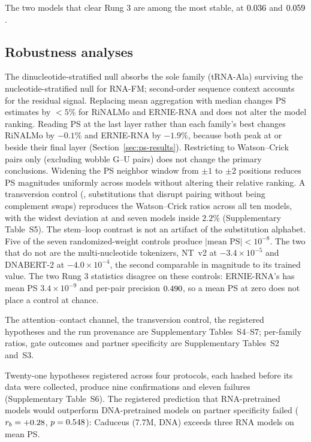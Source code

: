 \documentclass[11pt]{article}
\begin{document}
The two models that clear Rung 3 are among the most stable, at $0.036{}$
and $0.059{}$.

\subsection{Robustness analyses}
\label{sec:robustness}

The dinucleotide-stratified null absorbs the sole family (tRNA-Ala)
surviving the nucleotide-stratified null for RNA-FM; second-order sequence
context accounts for the residual signal. Replacing
mean aggregation with median changes PS estimates by $< 5$\% for RiNALMo
and ERNIE-RNA and does not alter the model ranking. Reading PS at the last
layer rather than each family's best changes RiNALMo by $-0.1$\% and ERNIE-RNA
by $-1.9$\%, because both peak at or beside their final layer
(Section~\ref{sec:ps-results}). Restricting to Watson--Crick pairs only (excluding wobble G--U
pairs) does not change the primary conclusions. Widening the PS neighbor
window from $\pm 1$ to $\pm 2$ positions reduces PS magnitudes uniformly
across models without altering their relative ranking.
A transversion control (\transversionAlphabet{}, substitutions that disrupt
pairing without being complement swaps) reproduces the Watson--Crick ratios
across all ten models, with the widest deviation \transversionWidestDeviation{}
at \transversionWidest{} and seven models inside $2.2$\%
(Supplementary Table~S5). The stem--loop contrast is not an artifact of
the substitution alphabet. Five of the seven randomized-weight
controls produce $|\text{mean PS}| < 10^{-8}$. The two that do not are the
multi-nucleotide tokenizers, NT~v2 at $-3.4 \times 10^{-5}$ and DNABERT-2 at
$-4.0 \times 10^{-4}$, the second comparable in magnitude to its trained value.
The two Rung 3 statistics disagree on these controls: ERNIE-RNA's has mean PS
$3.4 \times 10^{-9}$ and per-pair precision
$0.490{}$, so a mean PS at zero does
not place a control at chance.

The attention--contact channel, the transversion control, the registered
hypotheses and the run provenance are Supplementary Tables~S4--S7; per-family
ratios, gate outcomes and partner specificity are Supplementary Tables~S2
and~S3.


Twenty-one hypotheses registered across four protocols, each hashed before its
data were collected, produce nine confirmations and eleven failures
(Supplementary Table~S6). The registered prediction that RNA-pretrained
models would outperform DNA-pretrained models on partner specificity failed
($r_b = +0.28{}$, $p = 0.548{}$): Caduceus (7.7M, DNA) exceeds
three RNA models on mean PS.
\end{document}
